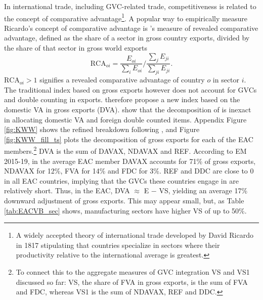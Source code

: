 \documentclass[a4paper]{article}
\begin{document}
In international trade, including GVC-related trade, competitiveness is related to the concept of comparative advantage\footnote{A widely accepted theory of international trade developed by David Ricardo in 1817 stipulating that countries specialize in sectors where their productivity relative to the international average is greatest.}. 
A popular way to empirically measure Ricardo's concept of comparative advantage is \citet{balassa1965trade}'s measure of revealed comparative advantage, defined as the share of a sector in gross country exports, divided by the share of that sector in gross world exports
%
\begin{equation}
\text{RCA}_{oi} = \frac{E_{oi}}{\sum_i E_{oi}} \Bigg/ \frac{\sum_j E_{ji}}{\sum_{ji} E_{ji}}.
\end{equation}
%
$\text{RCA}_{oi}>1$ signifies a revealed comparative advantage of country $o$ in sector $i$. The traditional index based on gross exports however does not account for GVCs and double counting in exports. \citet{koopman2014tracing} therefore propose a new index based on the domestic VA in gross exports (DVA). \citet{borin2019measuring} show that the decomposition of \citet{koopman2014tracing} is inexact in allocating domestic VA and foreign double counted items.%
Appendix Figure \ref{fig:KWW} shows the refined breakdown following \citet{borin2019measuring}, and Figure \ref{fig:KWW_fill_ts} plots the decomposition of gross exports for each of the EAC members.\footnote{To connect this to the aggregate measures of GVC integration VS and VS1 discussed so far: VS, the share of FVA in gross exports, is the sum of FVA and FDC, whereas VS1 is the sum of NDAVAX, REF and DDC. \vspace{-5mm}} DVA is the sum of DAVAX, NDAVAX and REF. According to EM 2015-19, in the average EAC member DAVAX accounts for 71\% of gross exports, NDAVAX for 12\%, FVA for 14\% and FDC for 3\%. REF and DDC are close to 0 in all EAC countries, implying that the GVCs these countries engage in are relatively short. Thus, in the EAC, DVA $\approx$ E $-$ VS, yielding an average 17\% downward adjustment of gross exports. This may appear small, but, as Table \ref{tab:EACVB_sec} shows, manufacturing sectors have higher VS of up to 50\%. \newline
 
\end{document}
